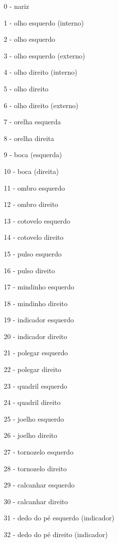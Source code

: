\begin{itemize}
\begin{itemize}
    \item[0] - nariz
    \item[1] - olho esquerdo (interno)
    \item[2] - olho esquerdo
    \item[3] - olho esquerdo (externo)
    \item[4] - olho direito (interno)
    \item[5] - olho direito
    \item[6] - olho direito (externo)
    \item[7] - orelha esquerda
    \item[8] - orelha direita
    \item[9] - boca (esquerda)
    \item[10] - boca (direita)
    \item[11] - ombro esquerdo
    \item[12] - ombro direito
    \item[13] - cotovelo esquerdo
    \item[14] - cotovelo direito
    \item[15] - pulso esquerdo
    \item[16] - pulso direito
    \item[17] - mindinho esquerdo
    \item[18] - mindinho direito
    \item[19] - indicador esquerdo
    \item[20] - indicador direito
    \item[21] - polegar esquerdo
    \item[22] - polegar direito
    \item[23] - quadril esquerdo
    \item[24] - quadril direito
    \item[25] - joelho esquerdo
    \item[26] - joelho direito
    \item[27] - tornozelo esquerdo
    \item[28] - tornozelo direito
    \item[29] - calcanhar esquerdo
    \item[30] - calcanhar direito
    \item[31] - dedo do pé esquerdo (indicador)
    \item[32] - dedo do pé direito (indicador)
\end{itemize}\label{lst:Pontos de referencia}


\end{itemize}
